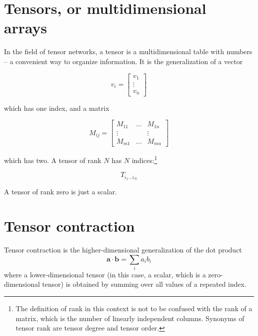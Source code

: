 \section{Tensors, or multidimensional arrays}


In the field of tensor networks, a tensor is a multidimensional table with numbers -- a
convenient way to organize information. It is the generalization of a vector

\begin{equation}
  v_i =
  \begin{bmatrix}
    v_1 \\
    \vdots \\
    v_n
  \end{bmatrix}
\end{equation}

which has one index, and a matrix

\begin{equation}
  M_{i j} =
  \begin{bmatrix}
  M_{1 1} & \dots & M_{1 n} \\
  \vdots  & & \vdots \\
  M_{m 1} & \dots & M_{m n}
  \end{bmatrix}
\end{equation}

which has two. A tensor of rank $N$ has $N$ indices:\footnote{The definition of rank in this
context is not to be confused with the rank of a matrix, which is the number of
linearly independent columns. Synonyms of tensor rank are tensor degree and
tensor order.}

\begin{equation}
  T_{i_1 \dots i_N}
\end{equation}

A tensor of rank zero is just a scalar.

\section{Tensor contraction}

Tensor contraction is the higher-dimensional generalization of the dot product
\begin{equation}
  \bm{a} \cdot \bm{b} = \sum_i a_i b_i
\end{equation}
where a lower-dimensional tensor (in this case, a scalar, which is a
zero-dimensional tensor) is obtained by summing over all values of a repeated
index.

